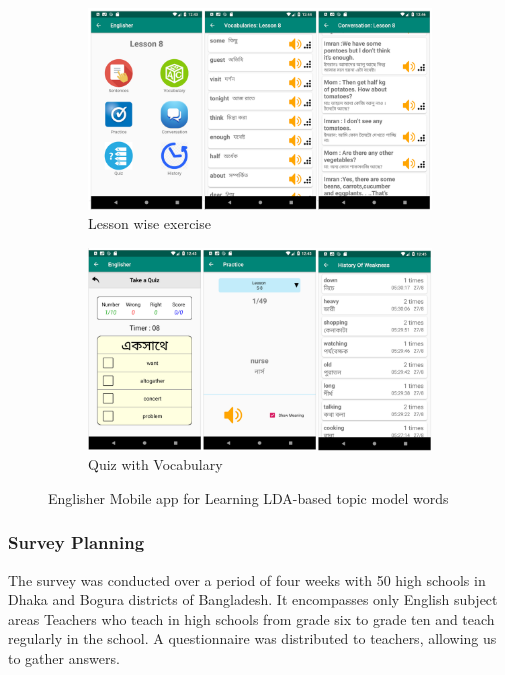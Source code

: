 \documentclass[sn-mathphys,Numbered]{sn-jnl}%
\theoremstyle{thmstyleone}%
\theoremstyle{thmstyletwo}%
\theoremstyle{thmstylethree}%
\begin{document}
\begin{figure}[h!]
\centering
\begin{subfigure}{\textwidth}
	\centering
    \includegraphics[width=\textwidth]{mobile_app_01.png}
    \caption{Lesson wise exercise}
    \label{fig:first}
\end{subfigure}
\hfill
\begin{subfigure}{\textwidth}
	\centering
    \includegraphics[width=\textwidth]{mobile_app_02.png}
    \caption{Quiz with Vocabulary}
    \label{fig:second}
\end{subfigure}
        
\caption{Englisher Mobile app for Learning LDA-based topic model words}
\label{fig:figures}
\end{figure}

\subsubsection{Survey Planning} The survey was conducted over a period of four weeks with 50 high schools in Dhaka and Bogura districts of Bangladesh. It encompasses only English subject areas Teachers who teach in high schools from grade six to grade ten and teach regularly in the school. A questionnaire was distributed to teachers, allowing us to gather answers. \\
\end{document}
